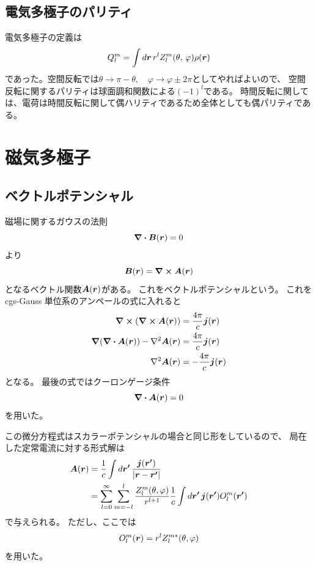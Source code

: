 \documentclass[../master.tex]{subfiles}
\begin{document}
\subsection{電気多極子のパリティ}
電気多極子の定義は
\begin{equation}
    Q_l^m = \int d\vb*{r}\, r^l Z_l^m(\theta,\,\varphi)\rho(\vb*{r})
\end{equation}
であった。空間反転では\(\theta\rightarrow\pi-\theta,\quad\varphi\rightarrow\varphi\pm 2\pi\)としてやればよいので、
空間反転に関するパリティは球面調和関数による\((-1)^l\)である。
時間反転に関しては、電荷は時間反転に関して偶ハリティであるため全体としても偶パリティである。

\section{磁気多極子}
\subsection{ベクトルポテンシャル}
磁場に関するガウスの法則
\begin{equation}
    \div \vb*{B}(\vb*{r}) = 0
\end{equation}
より
\begin{equation}
    \vb*{B}(\vb*{r}) = \curl \vb*{A}(\vb*{r})
\end{equation}
となるベクトル関数\(\vb*{A}(\vb*{r})\)がある。
これをベクトルポテンシャルという。
これを cgs-Gauss 単位系のアンペールの式に入れると
\begin{equation}\begin{aligned}[b]
    \curl(\curl \vb*{A}(\vb*{r}))
    &= \frac{4\pi}{c}\vb*{j}(\vb*{r})\\
    \grad(\div\vb*{A}(\vb*{r}))-\laplacian\vb*{A}(\vb*{r})
    &= \frac{4\pi}{c}\vb*{j}(\vb*{r})\\
    \laplacian\vb*{A}(\vb*{r})
    &= -\frac{4\pi}{c}\vb*{j}(\vb*{r})
\end{aligned}\end{equation}
となる。
最後の式ではクーロンゲージ条件
\begin{equation}
    \div\vb*{A}(\vb*{r})=0
\end{equation}
を用いた。

この微分方程式はスカラーポテンシャルの場合と同じ形をしているので、
局在した定常電流に対する形式解は
\begin{equation}\begin{aligned}[b]
    \vb*{A}(\vb*{r})
    &= \frac{1}{c}\int d\vb*{r'}\,
    \frac{\vb*{j}(\vb*{r'})}{\abs{\vb*{r}-\vb*{r'}}}\\
    &= \sum_{l=0}^{\infty}\sum_{m=-l}^{l}
    \frac{Z_l^m(\theta,\varphi)}{r^{l+1}}
    \frac{1}{c}\int d\vb*{r'}\,
    \vb*{j}(\vb*{r'})O_l^m(\vb*{r'})
\end{aligned}\end{equation}
で与えられる。
ただし、ここでは
\begin{equation}
    O_l^m(\vb*{r})=r^l Z_l^{m*}(\theta,\varphi)
\end{equation}
を用いた。
\end{document}
